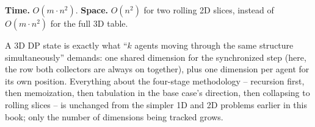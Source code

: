 \begin{complexitybox}
\textbf{Time.} $O(m \cdot n^2)$.
\textbf{Space.} $O(n^2)$ for two rolling 2D slices, instead of
$O(m \cdot n^2)$ for the full 3D table.
\end{complexitybox}

\begin{takeawaybox}
A 3D DP state is exactly what ``$k$ agents moving through the same
structure simultaneously'' demands: one shared dimension for the
synchronized step (here, the row both collectors are always on
together), plus one dimension per agent for its own position. Everything
about the four-stage methodology -- recursion first, then memoization,
then tabulation in the base case's direction, then collapsing to rolling
slices -- is unchanged from the simpler 1D and 2D problems earlier in
this book; only the number of dimensions being tracked grows.
\end{takeawaybox}
